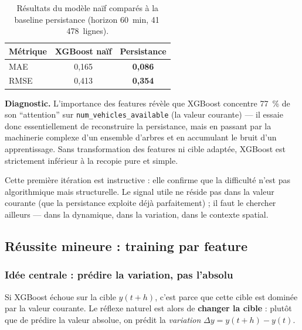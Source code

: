 \documentclass[fleqn, 12pt]{scrartcl}
\begin{document}
\begin{table}[htp]
\centering
\begin{tabular}{lcc}
\hline
\textbf{Métrique} & \textbf{XGBoost naïf} & \textbf{Persistance} \\
\hline
MAE & 0{,}165 & \textbf{0{,}086} \\
RMSE & 0{,}413 & \textbf{0{,}354} \\
\hline
\end{tabular}
\caption{Résultats du modèle naïf comparés à la baseline persistance (horizon 60~min, 41\,478~lignes).}
\label{tab:naive}
\end{table}

\textbf{Diagnostic.} L'importance des features révèle que XGBoost concentre 77~\% de son ``attention'' sur \texttt{num\_vehicles\_available} (la valeur courante) --- il essaie donc essentiellement de reconstruire la persistance, mais en passant par la machinerie complexe d'un ensemble d'arbres et en accumulant le bruit d'un apprentissage. Sans transformation des features ni cible adaptée, XGBoost est strictement inférieur à la recopie pure et simple.

\vspace{0.3cm}

Cette première itération est instructive : elle confirme que la difficulté n'est pas algorithmique mais structurelle. Le signal utile ne réside pas dans la valeur courante (que la persistance exploite déjà parfaitement) ; il faut le chercher ailleurs --- dans la dynamique, dans la variation, dans le contexte spatial.


\subsection{Réussite mineure : training par feature}
\label{ssec:feature}


\subsubsection*{Idée centrale : prédire la variation, pas l'absolu}

Si XGBoost échoue sur la cible $y(t+h)$, c'est parce que cette cible est dominée par la valeur courante. Le réflexe naturel est alors de \textbf{changer la cible} : plutôt que de prédire la valeur absolue, on prédit la \emph{variation} $\Delta y = y(t+h) - y(t)$.
\end{document}
